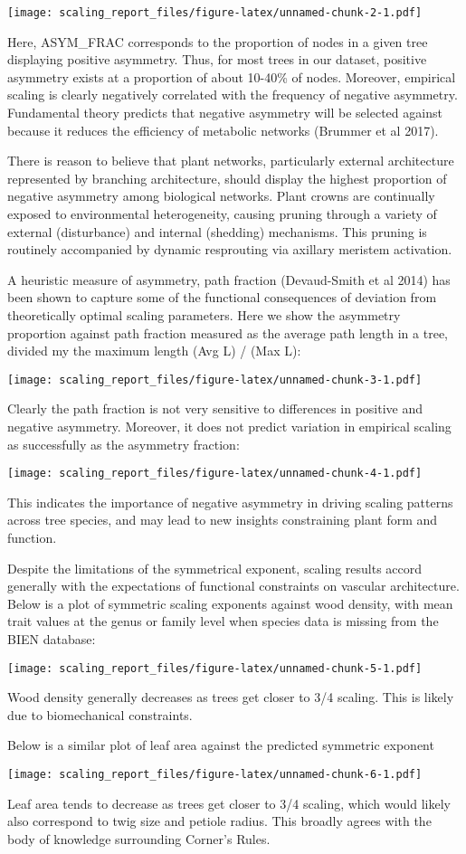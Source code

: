 \documentclass[]{article}
\begin{document}
\texttt{[image: scaling\_report\_files/figure-latex/unnamed-chunk-2-1.pdf]}

Here, ASYM\_FRAC corresponds to the proportion of nodes in a given tree
displaying positive asymmetry. Thus, for most trees in our dataset,
positive asymmetry exists at a proportion of about 10-40\% of nodes.
Moreover, empirical scaling is clearly negatively correlated with the
frequency of negative asymmetry. Fundamental theory predicts that
negative asymmetry will be selected against because it reduces the
efficiency of metabolic networks (Brummer et al 2017).

There is reason to believe that plant networks, particularly external
architecture represented by branching architecture, should display the
highest proportion of negative asymmetry among biological networks.
Plant crowns are continually exposed to environmental heterogeneity,
causing pruning through a variety of external (disturbance) and internal
(shedding) mechanisms. This pruning is routinely accompanied by dynamic
resprouting via axillary meristem activation.

A heuristic measure of asymmetry, path fraction (Devaud-Smith et al
2014) has been shown to capture some of the functional consequences of
deviation from theoretically optimal scaling parameters. Here we show
the asymmetry proportion against path fraction measured as the average
path length in a tree, divided my the maximum length (Avg L) / (Max L):

\texttt{[image: scaling\_report\_files/figure-latex/unnamed-chunk-3-1.pdf]}

Clearly the path fraction is not very sensitive to differences in
positive and negative asymmetry. Moreover, it does not predict variation
in empirical scaling as successfully as the asymmetry fraction:

\texttt{[image: scaling\_report\_files/figure-latex/unnamed-chunk-4-1.pdf]}

This indicates the importance of negative asymmetry in driving scaling
patterns across tree species, and may lead to new insights constraining
plant form and function.

Despite the limitations of the symmetrical exponent, scaling results
accord generally with the expectations of functional constraints on
vascular architecture. Below is a plot of symmetric scaling exponents
against wood density, with mean trait values at the genus or family
level when species data is missing from the BIEN database:

\texttt{[image: scaling\_report\_files/figure-latex/unnamed-chunk-5-1.pdf]}

Wood density generally decreases as trees get closer to 3/4 scaling.
This is likely due to biomechanical constraints.

Below is a similar plot of leaf area against the predicted symmetric
exponent

\texttt{[image: scaling\_report\_files/figure-latex/unnamed-chunk-6-1.pdf]}

Leaf area tends to decrease as trees get closer to 3/4 scaling, which
would likely also correspond to twig size and petiole radius. This
broadly agrees with the body of knowledge surrounding Corner's Rules.
\end{document}
